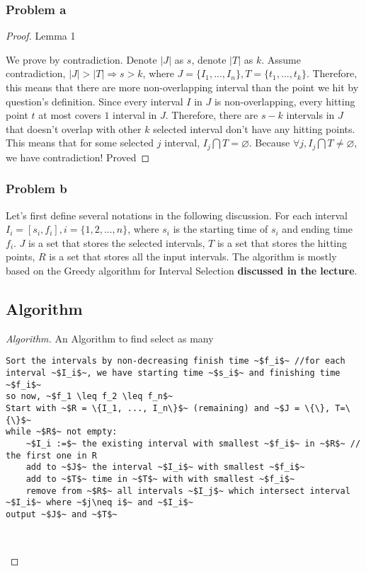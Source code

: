 \documentclass[openany]{article}
\begin{document}
\subsubsection*{Problem a}
\begin{proof}[Proof]{Lemma 1}

    We prove by contradiction. Denote $|J|$ as $s$, denote $|T|$ as $k$. Assume contradiction, $|J| > |T| \Rightarrow s > k$, where $J = \{I_1, ..., I_n\}, T=\{t_1, ..., t_k\}$.  Therefore, this means that there are more non-overlapping interval than the point we hit by question's definition. Since every interval $I$ in $J$ is non-overlapping, every hitting point $t$ at most covers $1$ interval in $J$. Therefore, there are $s-k$ intervals in $J$ that doesn't overlap with other $k$ selected interval don't have any hitting points. This means that for some selected $j$ interval, $I_j\bigcap T =\varnothing$. Because $\forall j, I_j \bigcap T \neq \varnothing$, we have contradiction! Proved
\end{proof}

\subsubsection*{Problem b}
Let's first define several notations in the following discussion. For each interval $I_i = [s_i, f_i], i = \{1,2,...,n\}$, where $s_i$ is the starting time of $s_i$ and ending time $f_i$. $J$ is a set that stores the selected intervals, $T$ is a set that stores the hitting points, $R$ is a set that stores all the input intervals. The algorithm is mostly based on the Greedy algorithm for Interval Selection \textbf{discussed in the lecture}.

\subsection*{Algorithm}
\begin{proof}[Algorithm]{}
		\renewcommand{\qedsymbol}{}
		An Algorithm to find select as many 
		\begin{lstlisting}[basicstyle=\fontsize{8}{9}\selectfont\ttfamily]
Sort the intervals by non-decreasing finish time ~$f_i$~ //for each interval ~$I_i$~, we have starting time ~$s_i$~ and finishing time ~$f_i$~
so now, ~$f_1 \leq f_2 \leq f_n$~
Start with ~$R = \{I_1, ..., I_n\}$~ (remaining) and ~$J = \{\}, T=\{\}$~
while ~$R$~ not empty:
    ~$I_i :=$~ the existing interval with smallest ~$f_i$~ in ~$R$~ // the first one in R
    add to ~$J$~ the interval ~$I_i$~ with smallest ~$f_i$~
    add to ~$T$~ time in ~$T$~ with with smallest ~$f_i$~
    remove from ~$R$~ all intervals ~$I_j$~ which intersect interval ~$I_i$~ where ~$j\neq i$~ and ~$I_i$~
output ~$J$~ and ~$T$~

        
		\end{lstlisting} 
\end{proof}
\end{document}

